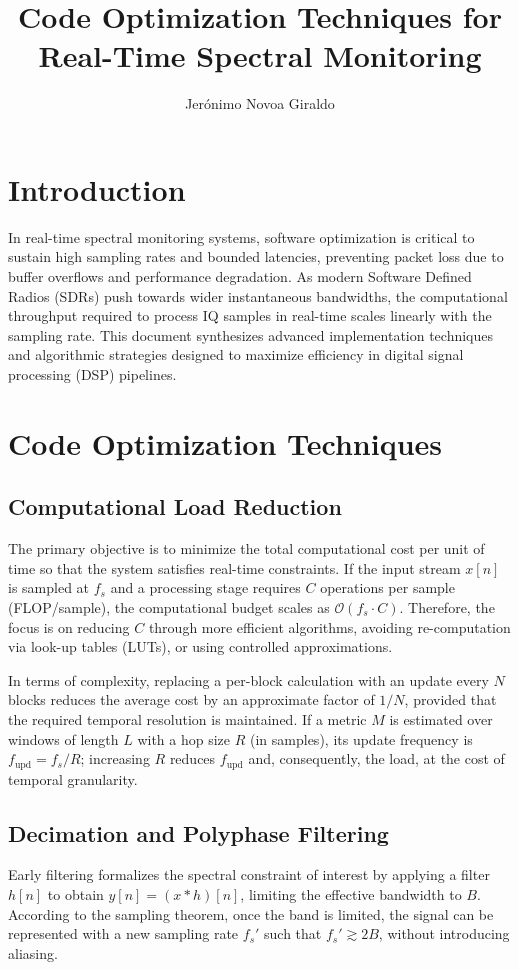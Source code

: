 \documentclass[11pt]{article}
\title{Code Optimization Techniques for Real-Time Spectral Monitoring}
\author{Jerónimo Novoa Giraldo}
\date{}
\begin{document}
\maketitle

\section{Introduction}
In real-time spectral monitoring systems, software optimization is critical to sustain high sampling rates and bounded latencies, preventing packet loss due to buffer overflows and performance degradation. As modern Software Defined Radios (SDRs) push towards wider instantaneous bandwidths, the computational throughput required to process IQ samples in real-time scales linearly with the sampling rate. This document synthesizes advanced implementation techniques and algorithmic strategies designed to maximize efficiency in digital signal processing (DSP) pipelines.

\section{Code Optimization Techniques}

\subsection{Computational Load Reduction}
The primary objective is to minimize the total computational cost per unit of time so that the system satisfies real-time constraints. If the input stream $x[n]$ is sampled at $f_s$ and a processing stage requires $C$ operations per sample (FLOP/sample), the computational budget scales as $\mathcal{O}(f_s \cdot C)$. Therefore, the focus is on reducing $C$ through more efficient algorithms, avoiding re-computation via look-up tables (LUTs), or using controlled approximations.

In terms of complexity, replacing a per-block calculation with an update every $N$ blocks reduces the average cost by an approximate factor of $1/N$, provided that the required temporal resolution is maintained. If a metric $M$ is estimated over windows of length $L$ with a hop size $R$ (in samples), its update frequency is $f_{\text{upd}} = f_s/R$; increasing $R$ reduces $f_{\text{upd}}$ and, consequently, the load, at the cost of temporal granularity.

\subsection{Decimation and Polyphase Filtering}
Early filtering formalizes the spectral constraint of interest by applying a filter $h[n]$ to obtain $y[n] = (x*h)[n]$, limiting the effective bandwidth to $B$. According to the sampling theorem, once the band is limited, the signal can be represented with a new sampling rate $f_s'$ such that $f_s' \gtrsim 2B$, without introducing aliasing.
\end{document}
